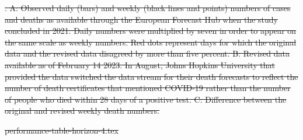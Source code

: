 \documentclass[10pt,a4paper,twocolumn]{article}
\providecommand{\DIFdeltex}[1]{{\protect\color{red}\sout{#1}}}                      %
\providecommand{\DIFdelbegin}{} %
\providecommand{\DIFdelend}{} %
\providecommand{\DIFdelFL}[1]{\DIFdel{#1}} %
\providecommand{\DIFdel}[1]{\texorpdfstring{\DIFdeltex{#1}}{}} %
\begin{document}
\DIFdelbegin %
{%
\DIFdelFL{. A: Observed daily (bars) and weekly (black lines and points) numbers of cases and deaths as available through the European Forecast Hub when the study concluded in 2021. Daily numbers were multiplied by seven in order to appear on the same scale as weekly numbers. Red dots represent days for which the original data and the revised data disagreed by more than five percent. B: Revised data available as of February 14 2023. In August, Johns Hopkins University that provided the data switched the data stream for their death forecasts to reflect the number of death certificates that mentioned COVID-19 rather than the number of people who died within 28 days of a positive test. C: Difference between the original and revised weekly death numbers.}}
\DIFdelend %



\DIFdelbegin %
\DIFdel{performance-table-horizon-4.tex
}\DIFdelend %
\end{document}
